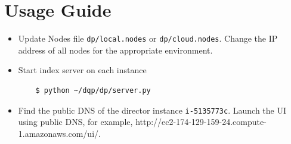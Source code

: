 \documentclass[letterpaper,11pt,twoside]{article}
\begin{document}
\section{Usage Guide}

\begin{itemize}
	\item Update Nodes file \texttt{dp/local.nodes} or \texttt{dp/cloud.nodes}. Change the IP address of all nodes for the appropriate environment.
	\item Start index server on each instance
\begin{verbatim}
	$ python ~/dqp/dp/server.py
\end{verbatim}
	\item Find the public DNS of the director instance \texttt{i-5135773c}. Launch the UI using public DNS, for example, http://ec2-174-129-159-24.compute-1.amazonaws.com/ui/.
\end{itemize}
\end{document}
